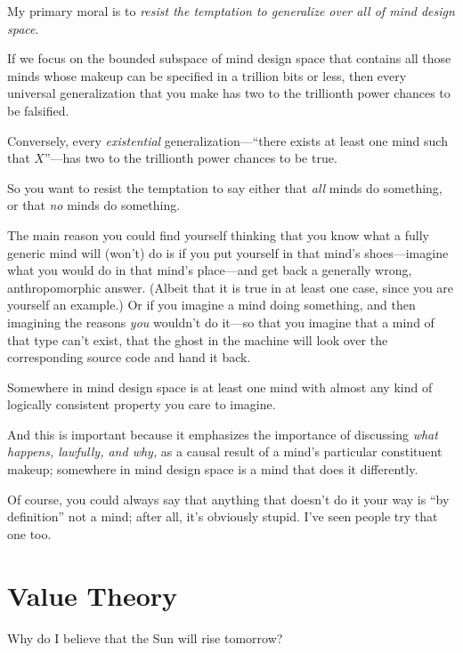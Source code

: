 {
 My primary moral is to \textit{resist the temptation to generalize
over all of mind design space}.}

{
 If we focus on the bounded subspace of mind design space that
contains all those minds whose makeup can be specified in a trillion
bits or less, then every universal generalization that you make has two
to the trillionth power chances to be falsified.}

{
 Conversely, every \textit{existential}
generalization---``there exists at least one mind such
that $X$''---has two to the trillionth power chances to
be true.}

{
 So you want to resist the temptation to say either that
\textit{all} minds do something, or that \textit{no} minds do
something.}

{
 The main reason you could find yourself thinking that you know
what a fully generic mind will (won't) do is if you put
yourself in that mind's shoes---imagine what you would
do in that mind's place---and get back a generally
wrong, anthropomorphic answer. (Albeit that it is true in at least one
case, since you are yourself an example.) Or if you imagine a mind
doing something, and then imagining the reasons \textit{you}
wouldn't do it---so that you imagine that a mind of
that type can't exist, that the ghost in the machine
will look over the corresponding source code and hand it back.}

{
 Somewhere in mind design space is at least one mind with almost
any kind of logically consistent property you care to imagine.}

{
 And this is important because it emphasizes the importance of
discussing \textit{what happens, lawfully, and why,} as a causal result
of a mind's particular constituent makeup; somewhere in
mind design space is a mind that does it differently.}

{
 Of course, you could always say that anything that
doesn't do it your way is ``by
definition'' not a mind; after all,
it's obviously stupid. I've seen people
try that one too.}

\myendsectiontext

\chapter{Value Theory}


{
 Why do I believe that the Sun will rise tomorrow? }


